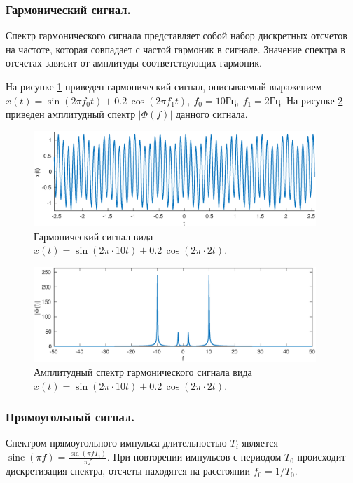 \documentclass[a4paper,14pt]{extarticle}
\DeclareMathOperator{\sinc}{sinc}
\begin{document}
\subsubsection{Гармонический сигнал.}
Спектр гармонического сигнала представляет собой набор дискретных отсчетов на частоте, которая совпадает с частой гармоник в сигнале. Значение спектра в отсчетах зависит от амплитуды соответствующих гармоник. 

На рисунке \ref{sin_x} приведен гармонический сигнал, описываемый выражением $x(t) = \sin(2 \pi f_0 t) + 0.2 \, \cos(2 \pi f_1 t), ~ f_0 = 10\text{Гц}, ~ f_1 = 2\text{Гц}$. На рисунке \ref{sin_s} приведен амплитудный спектр $|\Phi(f)|$ данного сигнала.	

\begin{figure}[H]
\includegraphics[width=0.95\textwidth]{sin_x.eps}
\captionsetup{justification=centering,margin=2cm}
\caption{Гармонический сигнал вида $x(t) = \sin(2 \pi \cdot 10 t) + 0.2 \, \cos(2 \pi \cdot 2 t)$.}
\label{sin_x}
\end{figure}

\begin{figure}[H]
\includegraphics[width=0.95\textwidth]{sin_s.eps}
\captionsetup{justification=centering,margin=1cm}
\caption{Амплитудный спектр гармонического сигнала вида $x(t) = \sin(2 \pi \cdot 10 t) + 0.2 \, \cos(2 \pi \cdot 2 t)$.}
\label{sin_s}
\end{figure}


\subsubsection{Прямоугольный сигнал.}
Спектром прямоугольного импульса длительностью $T_i$ является $\sinc(\pi f)=\frac{\sin(\pi f T_i)}{\pi f}$. При повторении импульсов с периодом $T_0$ происходит дискретизация спектра, отсчеты находятся на расстоянии $f_0 = 1/T_0$. 
\end{document}
